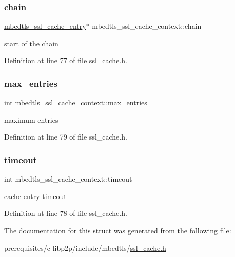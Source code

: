 \subsubsection{\texorpdfstring{chain}{chain}}
{\footnotesize\ttfamily \mbox{\hyperlink{structmbedtls__ssl__cache__entry}{mbedtls\+\_\+ssl\+\_\+cache\+\_\+entry}}$\ast$ mbedtls\+\_\+ssl\+\_\+cache\+\_\+context\+::chain}

start of the chain 

Definition at line 77 of file ssl\+\_\+cache.\+h.

\mbox{\label{structmbedtls__ssl__cache__context_a5a490fa803aa85541cab7808db43c477}} 
\subsubsection{\texorpdfstring{max\+\_\+entries}{max\_entries}}
{\footnotesize\ttfamily int mbedtls\+\_\+ssl\+\_\+cache\+\_\+context\+::max\+\_\+entries}

maximum entries 

Definition at line 79 of file ssl\+\_\+cache.\+h.

\mbox{\label{structmbedtls__ssl__cache__context_af5d2f556c477eb510117b4a34c02dba4}} 
\subsubsection{\texorpdfstring{timeout}{timeout}}
{\footnotesize\ttfamily int mbedtls\+\_\+ssl\+\_\+cache\+\_\+context\+::timeout}

cache entry timeout 

Definition at line 78 of file ssl\+\_\+cache.\+h.



The documentation for this struct was generated from the following file\+:\begin{DoxyCompactItemize}
\item 
prerequisites/c-\/libp2p/include/mbedtls/\mbox{\hyperlink{ssl__cache_8h}{ssl\+\_\+cache.\+h}}\end{DoxyCompactItemize}
